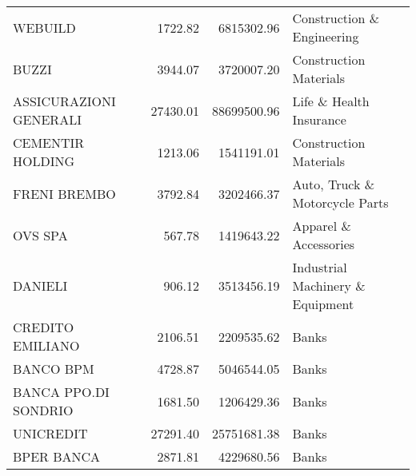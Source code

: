 \begin{tabular}{lrrl}
               WEBUILD &     1722.82 &   6815302.96 &                         Construction \& Engineering \\
                 BUZZI &     3944.07 &   3720007.20 &                             Construction Materials \\
ASSICURAZIONI GENERALI &    27430.01 &  88699500.96 &                            Life \& Health Insurance \\
      CEMENTIR HOLDING &     1213.06 &   1541191.01 &                             Construction Materials \\
          FRENI BREMBO &     3792.84 &   3202466.37 &                     Auto, Truck \& Motorcycle Parts \\
               OVS SPA &      567.78 &   1419643.22 &                              Apparel \& Accessories \\
               DANIELI &      906.12 &   3513456.19 &                   Industrial Machinery \& Equipment \\
      CREDITO EMILIANO &     2106.51 &   2209535.62 &                                              Banks \\
             BANCO BPM &     4728.87 &   5046544.05 &                                              Banks \\
  BANCA PPO.DI SONDRIO &     1681.50 &   1206429.36 &                                              Banks \\
             UNICREDIT &    27291.40 &  25751681.38 &                                              Banks \\
            BPER BANCA &     2871.81 &   4229680.56 &                                              Banks \\
\bottomrule
\end{tabular}
